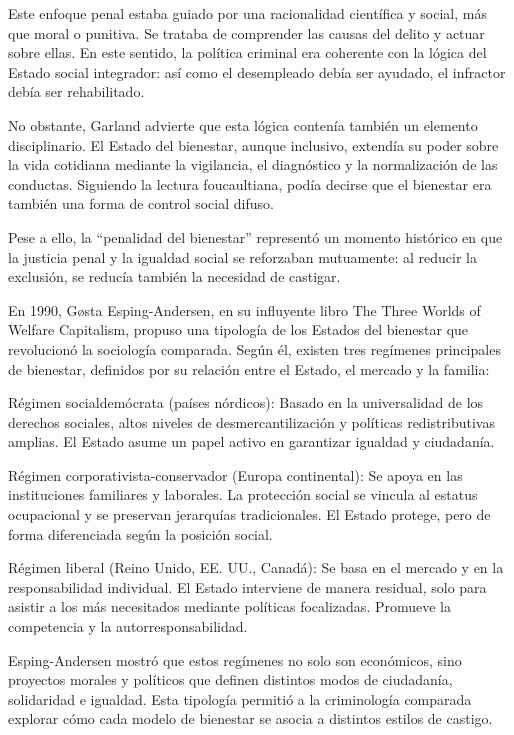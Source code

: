\documentclass[
  spanish,
  letterpaper,
  DIV=11,
  numbers=noendperiod]{scrreprt}
\begin{document}
Este enfoque penal estaba guiado por una racionalidad científica y
social, más que moral o punitiva. Se trataba de comprender las causas
del delito y actuar sobre ellas. En este sentido, la política criminal
era coherente con la lógica del Estado social integrador: así como el
desempleado debía ser ayudado, el infractor debía ser rehabilitado.

No obstante, Garland advierte que esta lógica contenía también un
elemento disciplinario. El Estado del bienestar, aunque inclusivo,
extendía su poder sobre la vida cotidiana mediante la vigilancia, el
diagnóstico y la normalización de las conductas. Siguiendo la lectura
foucaultiana, podía decirse que el bienestar era también una forma de
control social difuso.

Pese a ello, la ``penalidad del bienestar'' representó un momento
histórico en que la justicia penal y la igualdad social se reforzaban
mutuamente: al reducir la exclusión, se reducía también la necesidad de
castigar.

En 1990, Gøsta Esping-Andersen, en su influyente libro The Three Worlds
of Welfare Capitalism, propuso una tipología de los Estados del
bienestar que revolucionó la sociología comparada. Según él, existen
tres regímenes principales de bienestar, definidos por su relación entre
el Estado, el mercado y la familia:

Régimen socialdemócrata (países nórdicos): Basado en la universalidad de
los derechos sociales, altos niveles de desmercantilización y políticas
redistributivas amplias. El Estado asume un papel activo en garantizar
igualdad y ciudadanía.

Régimen corporativista-conservador (Europa continental): Se apoya en las
instituciones familiares y laborales. La protección social se vincula al
estatus ocupacional y se preservan jerarquías tradicionales. El Estado
protege, pero de forma diferenciada según la posición social.

Régimen liberal (Reino Unido, EE. UU., Canadá): Se basa en el mercado y
en la responsabilidad individual. El Estado interviene de manera
residual, solo para asistir a los más necesitados mediante políticas
focalizadas. Promueve la competencia y la autorresponsabilidad.

Esping-Andersen mostró que estos regímenes no solo son económicos, sino
proyectos morales y políticos que definen distintos modos de ciudadanía,
solidaridad e igualdad. Esta tipología permitió a la criminología
comparada explorar cómo cada modelo de bienestar se asocia a distintos
estilos de castigo.
\end{document}

